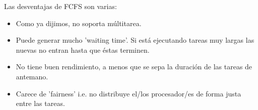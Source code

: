 Las desventajas de FCFS son varias:

\begin{itemize}
\item Como ya dijimos, no soporta múltitarea.
\item Puede generar mucho 'waiting time'.\newline
	Si está ejecutando tareas muy largas las nuevas no entran hasta que éstas terminen.
\item No tiene buen rendimiento, a menos que se sepa la duración de las tareas de antemano.
\item Carece de 'fairness' i.e. no distribuye el/los procesador/es de forma justa entre las tareas.
\end{itemize}